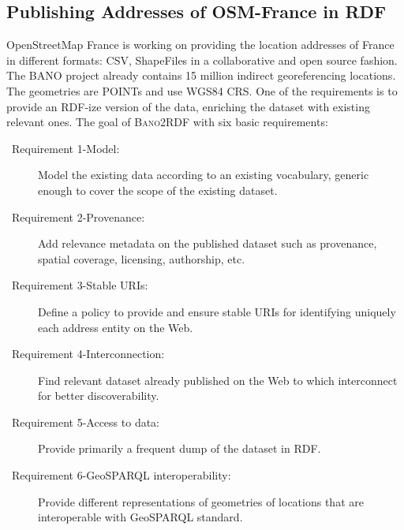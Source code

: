 \begin{table}[!htbp]
\end{table}


\subsection{Publishing Addresses of OSM-France in RDF}
\label{sec:bano2rdf}
OpenStreetMap France is working on providing the location addresses of France in different formats: CSV, ShapeFiles in a collaborative and open source fashion. The BANO project already contains  15 million indirect georeferencing locations. The geometries are POINTs and use WGS84 CRS. One of the requirements is to provide an RDF-ize version of the data, enriching the dataset with existing relevant ones. The goal of \textsc{Bano2RDF} with six basic requirements:
\begin{description}
\item [~Requirement 1-Model:] Model the existing data according to an existing vocabulary, generic enough to cover the scope of the existing dataset.
\item[~Requirement 2-Provenance:] Add relevance metadata on the published dataset  such as provenance, spatial coverage, licensing, authorship, etc.
\item[~Requirement 3-Stable URIs:] Define a policy to provide and ensure stable URIs for identifying uniquely each address entity on the Web.
\item[~Requirement 4-Interconnection:] Find relevant dataset already published on the Web to which interconnect for better discoverability.

\item[~Requirement 5-Access to data:] Provide primarily a frequent dump of the dataset in RDF.

\item[~Requirement 6-GeoSPARQL interoperability:] Provide different representations of geometries of locations that are interoperable with GeoSPARQL standard.

\end{description}

